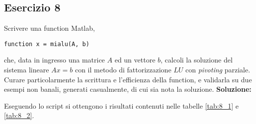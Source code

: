 \subsection{Esercizio 8}
Scrivere una function Matlab,
\begin{lstlisting}
function x = mialu(A, b)
\end{lstlisting}
che, data in ingresso una matrice $A$ ed un vettore $b$, calcoli la soluzione
del sistema lineare $Ax = b$ con il metodo di fattorizzazione $LU$ con \textit{pivoting} parziale.
Curare particolarmente la scrittura e l'efficienza della function,
e validarla su due esempi non banali, generati casualmente,
di cui sia nota la soluzione.
\newline \textbf{Soluzione:}


Eseguendo lo script  si ottengono i risultati contenuti nelle
tabelle \ref{tab:8_1} e \ref{tab:8_2}.

